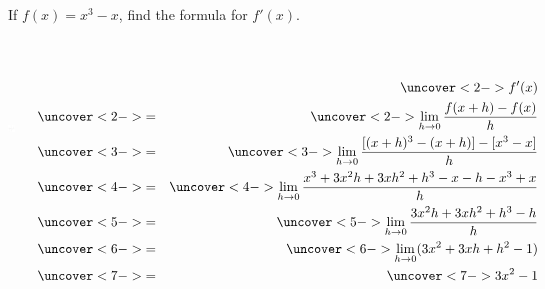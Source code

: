 \begin{frame}
\begin{example}[Example 2, p. 124]
If $f(x) = x^3-x$, find the formula for $f'(x)$.
\begin{columns}[c]
\ \includegraphics[height=3cm]{derivatives/pictures/03-02-ex2a.pdf}%

\ %
%
\begin{eqnarray*}
&&\uncover<2->{f'(x)}\\%
 & \uncover<2->{ = } &%
\uncover<2->{\lim_{h\rightarrow 0} \frac{f(x+h)-f(x)}{h}}\\%
 & \uncover<3->{ = } &%
\uncover<3->{\lim_{h\rightarrow 0} \frac{[(x+h)^3 - (x+h)]-[x^3-x]}{h}}\\%
 & \uncover<4->{ = } &%
\uncover<4->{\lim_{h\rightarrow 0} \frac{x^3 + 3x^2h+3xh^2+h^3-x-h-x^3+x}{h}}\\%
 & \uncover<5->{ = } &%
\uncover<5->{\lim_{h\rightarrow 0} \frac{3x^2h+3xh^2+h^3-h}{h}}\\%
 & \uncover<6->{ = } &%
\uncover<6->{\lim_{h\rightarrow 0} (3x^2+3xh+h^2-1)}\\%
 & \uncover<7->{ = } &%
\uncover<7->{3x^2-1}\\%
\end{eqnarray*}
\end{columns}
\end{example}
\end{frame}
